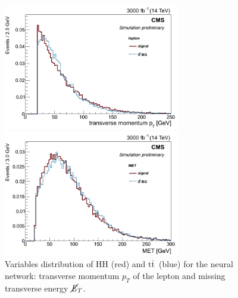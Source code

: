 \documentclass[10pt,a4paper]{article}
\newcommand{\ww}{7.7cm} %
\newcommand{\dd}{-2mm} %
\renewcommand{\tt}{$\text{t}\bar{\text{t}}$}
\newcommand{\MET}{$\cancel{\it{E}}_{T}$}
\begin{document}
\begin{figure}[h]
    \begin{minipage}[h!]{\ww}
      \centering
      \includegraphics[width=\ww]{figs/leptonPt.png}
    \end{minipage}
    \begin{minipage}[h!]{\ww}
      \centering
      \includegraphics[width=\ww]{figs/MET.png}
    \end{minipage}
    \hspace{9mm}
  \vspace{\dd}
  \caption{Variables distribution of HH (red) and \tt\ (blue) for the neural network: transverse momentum $p_T$ of the lepton and missing transverse energy \MET.} \label{vars1}

\end{figure}
\end{document}
